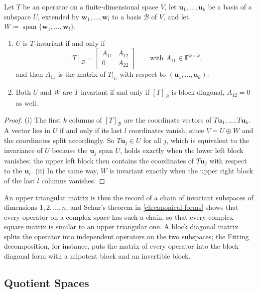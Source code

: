 \begin{proposition}
\label{prop:block-triangular}
Let $T$ be an operator on a finite-dimensional space $V$, let $\mathbf u_1,\ldots,\mathbf u_k$ be a basis of a subspace $U$, extended by $\mathbf w_1,\ldots,\mathbf w_l$ to a basis $\mathcal B$ of $V$, and let $W\coloneqq\operatorname{span}\{\mathbf w_1,\ldots,\mathbf w_l\}$.
\begin{enumerate}
\item $U$ is $T$-invariant if and only if
\[
[T]_{\mathcal B}=\begin{bmatrix}A_{11}&A_{12}\\0&A_{22}\end{bmatrix}\qquad\text{with }A_{11}\in\mathbb F^{k\times k},
\]
and then $A_{11}$ is the matrix of $T|_U$ with respect to $(\mathbf u_1,\ldots,\mathbf u_k)$.
\item Both $U$ and $W$ are $T$-invariant if and only if $[T]_{\mathcal B}$ is block diagonal, $A_{12}=0$ as well.
\end{enumerate}
\end{proposition}

\begin{proof}
(i) The first $k$ columns of $[T]_{\mathcal B}$ are the coordinate vectors of $T\mathbf u_1,\ldots,T\mathbf u_k$. A vector lies in $U$ if and only if its last $l$ coordinates vanish, since $V=U\oplus W$ and the coordinates split accordingly. So $T\mathbf u_j\in U$ for all $j$, which is equivalent to the invariance of $U$ because the $\mathbf u_j$ span $U$, holds exactly when the lower left block vanishes; the upper left block then contains the coordinates of $T\mathbf u_j$ with respect to the $\mathbf u_i$. (ii) In the same way, $W$ is invariant exactly when the upper right block of the last $l$ columns vanishes.
\end{proof}

An upper triangular matrix is thus the record of a chain of invariant subspaces of dimensions $1,2,\ldots,n$, and Schur's theorem in \cref{ch:canonical-forms} shows that every operator on a complex space has such a chain, so that every complex square matrix is similar to an upper triangular one. A block diagonal matrix splits the operator into independent operators on the two subspaces; the Fitting decomposition, for instance, puts the matrix of every operator into the block diagonal form with a nilpotent block and an invertible block.

\subsection{Quotient Spaces}

